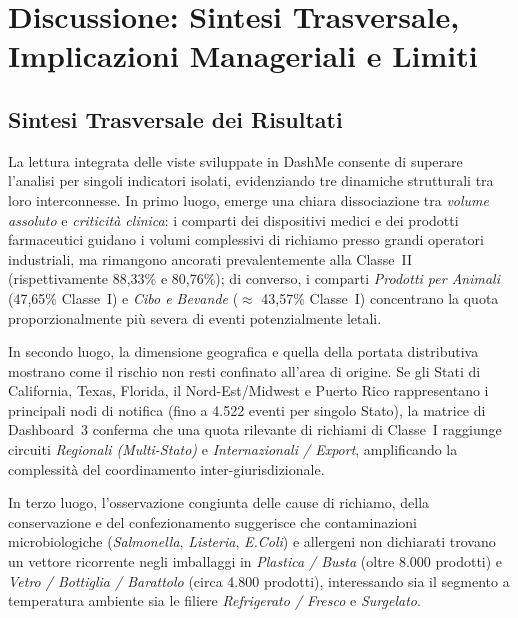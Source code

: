 \chapter{Discussione: Sintesi Trasversale, Implicazioni Manageriali e Limiti}
\label{sec:discussion}

\section{Sintesi Trasversale dei Risultati}
La lettura integrata delle viste sviluppate in DashMe consente di superare l'analisi per singoli indicatori isolati, evidenziando tre dinamiche strutturali tra loro interconnesse. In primo luogo, emerge una chiara dissociazione tra \textit{volume assoluto} e \textit{criticità clinica}: i comparti dei dispositivi medici e dei prodotti farmaceutici guidano i volumi complessivi di richiamo presso grandi operatori industriali, ma rimangono ancorati prevalentemente alla Classe~II (rispettivamente 88,33\% e 80,76\%); di converso, i comparti \textit{Prodotti per Animali} (47,65\% Classe~I) e \textit{Cibo e Bevande} ($\approx$ 43,57\% Classe~I) concentrano la quota proporzionalmente più severa di eventi potenzialmente letali.

In secondo luogo, la dimensione geografica e quella della portata distributiva mostrano come il rischio non resti confinato all'area di origine. Se gli Stati di California, Texas, Florida, il Nord-Est/Midwest e Puerto Rico rappresentano i principali nodi di notifica (fino a 4.522 eventi per singolo Stato), la matrice di Dashboard~3 conferma che una quota rilevante di richiami di Classe~I raggiunge circuiti \textit{Regionali (Multi-Stato)} e \textit{Internazionali / Export}, amplificando la complessità del coordinamento inter-giurisdizionale.

In terzo luogo, l'osservazione congiunta delle cause di richiamo, della conservazione e del confezionamento suggerisce che contaminazioni microbiologiche (\textit{Salmonella}, \textit{Listeria}, \textit{E.Coli}) e allergeni non dichiarati trovano un vettore ricorrente negli imballaggi in \textit{Plastica / Busta} (oltre 8.000 prodotti) e \textit{Vetro / Bottiglia / Barattolo} (circa 4.800 prodotti), interessando sia il segmento a temperatura ambiente sia le filiere \textit{Refrigerato / Fresco} e \textit{Surgelato}. 

